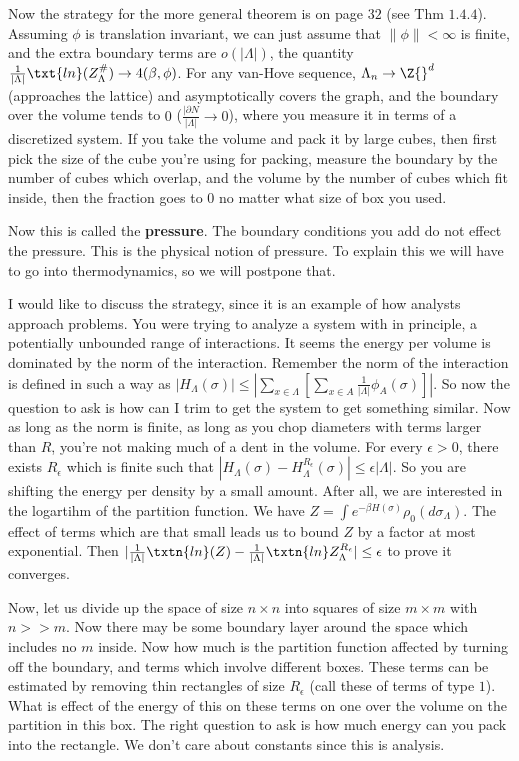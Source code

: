 Now the strategy for the more general theorem is on page $32$ (see Thm $1.4.4$). Assuming $\phi$ is translation invariant, we can just assume that $\|\phi\| < \infty$ is finite, and the extra boundary terms are $o(|\Lambda|)$, the quantity $\frac{1}{|\Lambda|}\txt{ln}(Z_{\Lambda}^{\#}) \to 4(\beta, \phi)$. For any van-Hove sequence, $\Lambda_n \to \Z{}^d$ (approaches the lattice) and asymptotically covers the graph, and the boundary over the volume tends to $0$ ($\frac{|\partial N}{|\Lambda|} \to 0$), where you measure it in terms of a discretized system. If you take the volume and pack it by large cubes, then first pick the size of the cube you're using for packing, measure the boundary by the number of cubes which overlap, and the volume by the number of cubes which fit inside, then the fraction goes to $0$ no matter what size of box you used. 

Now this is called the \textbf{pressure}. The boundary conditions you add do not effect the pressure. This is the physical notion of pressure. To explain this we will have to go into thermodynamics, so we will postpone that. 

I would like to discuss the strategy, since it is an example of how analysts approach problems. You were trying to analyze a system with in principle, a potentially unbounded range of interactions. It seems the energy per volume is dominated by the norm of the interaction. Remember the norm of the interaction is defined in such a way as $|H_{\Lambda}(\sigma)| \leq \left|\sum_{x \in \Lambda} \left[\sum_{x \in A} \frac{1}{|\Lambda|} \phi_A(\sigma)\right] \right|$. So now the question to ask is how can I trim to get the system to get something similar. Now as long as the norm is finite, as long as you chop diameters with terms larger than $R$, you're not making much of a dent in the volume. For every $\epsilon > 0$, there exists $R_{\epsilon}$ which is finite such that $|H_{\Lambda}(\sigma) - H_{\Lambda}^{R_{\epsilon}}(\sigma) | \leq \epsilon |\Lambda|$. So you are shifting the energy per density by a small amount. After all, we are interested in the logartihm of the partition function. We have $Z = \int e^{-\beta H(\sigma)} \rho_0(d\sigma_{\Lambda})$.  The effect of terms which are that small leads us to bound $Z$ by a factor at most exponential. Then $|\frac{1}{|\Lambda|} \txtn{ln}(Z) - \frac{1}{|\Lambda|} \txtn{ln} Z_{\Lambda}^{R_{\epsilon}}| \leq \epsilon$ to prove it converges.  

Now, let us divide up the space of size $n \times n$ into squares of size $m \times m$ with $n >> m$. Now there may be some boundary layer around the space which includes no $m$ inside. Now how much is the partition function affected by turning off the boundary, and terms which involve different boxes. These terms can be estimated by removing thin rectangles of size $R_{\epsilon}$ (call these of terms of type $1$). What is effect of the energy of this on these terms on one over the volume on the partition in this box. The right question to ask is how much energy can you pack into the rectangle. We don't care about constants since this is analysis. 


